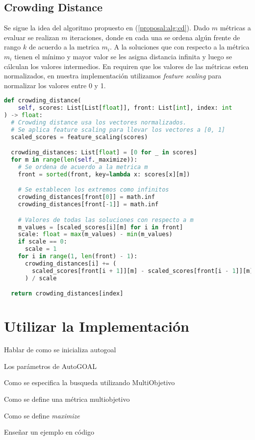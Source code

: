 \subsection{Crowding Distance}
Se sigue la idea del algoritmo propuesto en (\ref{proposal:alg:cd}). Dado $m$ m\'etricas a evaluar se realizan $m$ iteraciones, donde en cada una se ordena alg\'un frente de rango $k$ de acuerdo a la metrica $m_i$. A la soluciones que con respecto a la m\'etrica $m_i$ tienen el m\'inimo y mayor valor se les asigna distancia infinita y luego se c\'alculan los valores intermedios. En \cite{deb2002fast} requiren que los valores de las m\'etricas esten normalizados, en nuestra implementaci\'on utilizamos \textit{feature scaling} para normalizar los valores entre 0 y 1.

\begin{lstlisting}[language=Python]
def crowding_distance(
    self, scores: List[List[float]], front: List[int], index: int
) -> float:
  # Crowding distance usa los vectores normalizados.
  # Se aplica feature scaling para llevar los vectores a [0, 1]
  scaled_scores = feature_scaling(scores)

  crowding_distances: List[float] = [0 for _ in scores]
  for m in range(len(self._maximize)):
    # Se ordena de acuerdo a la metrica m
    front = sorted(front, key=lambda x: scores[x][m])

    # Se establecen los extremos como infinitos
    crowding_distances[front[0]] = math.inf
    crowding_distances[front[-1]] = math.inf

    # Valores de todas las soluciones con respecto a m 
    m_values = [scaled_scores[i][m] for i in front]
    scale: float = max(m_values) - min(m_values)
    if scale == 0:
      scale = 1
    for i in range(1, len(front) - 1):
      crowding_distances[i] += (
        scaled_scores[front[i + 1]][m] - scaled_scores[front[i - 1]][m]
      ) / scale

  return crowding_distances[index]
\end{lstlisting}

\section{Utilizar la Implementaci\'on}

Hablar de como se inicializa autogoal

Los par\'ametros de AutoGOAL

Como se especifica la busqueda utilizando MultiObjetivo

Como se define una m\'etrica multiobjetivo

Como se define \textit{maximize}

Ense\~nar un ejemplo en c\'odigo 
